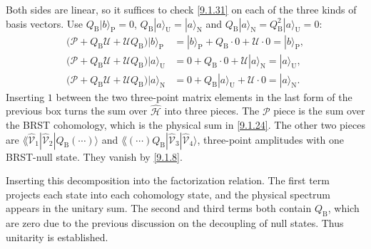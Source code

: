 \begin{tcolorbox}[breakable]
	\begin{remark}
		Both sides are linear, so it suffices to check \eqref{9.1.31} on each of the three kinds of basis vectors. Use $Q_{\mathrm B}|b\rangle_{\mathrm P}=0$, $Q_{\mathrm B}|a\rangle_{\mathrm U}=|a\rangle_{\mathrm N}$ and $Q_{\mathrm B}|a\rangle_{\mathrm N}=Q_{\mathrm B}^2|a\rangle_{\mathrm U}=0$:
		\begin{align*}
			\bigl(\mathscr P+Q_{\mathrm B}\mathscr U+\mathscr UQ_{\mathrm B}\bigr)|b\rangle_{\mathrm P}&=|b\rangle_{\mathrm P}+Q_{\mathrm B}\cdot0+\mathscr U\cdot0=|b\rangle_{\mathrm P},\\
			\bigl(\mathscr P+Q_{\mathrm B}\mathscr U+\mathscr UQ_{\mathrm B}\bigr)|a\rangle_{\mathrm U}&=0+Q_{\mathrm B}\cdot0+\mathscr U|a\rangle_{\mathrm N}=|a\rangle_{\mathrm U},\\
			\bigl(\mathscr P+Q_{\mathrm B}\mathscr U+\mathscr UQ_{\mathrm B}\bigr)|a\rangle_{\mathrm N}&=0+Q_{\mathrm B}|a\rangle_{\mathrm U}+\mathscr U\cdot0=|a\rangle_{\mathrm N}.
		\end{align*}
		Inserting $1$ between the two three-point matrix elements in the last form of the previous box turns the sum over $\hat{\mathscr H}$ into three pieces. The $\mathscr P$ piece is the sum over the BRST cohomology, which is the physical sum in \eqref{9.1.24}. The other two pieces are $\lAngle\hat{\mathscr V}_1|\hat{\mathscr V}_2|Q_{\mathrm B}(\cdots)\rangle$ and $\lAngle(\cdots)Q_{\mathrm B}|\hat{\mathscr V}_3|\hat{\mathscr V}_4\rangle$, three-point amplitudes with one BRST-null state. They vanish by \eqref{9.1.8}.
	\end{remark}
\end{tcolorbox}
Inserting this decomposition into the factorization relation. The first term projects each state into each cohomology state, and the physical spectrum appears in the unitary sum.
The second and third terms both contain $Q_{\mathrm{B}}$, which are zero due to the previous discussion on the decoupling of null states. Thus unitarity is established.

